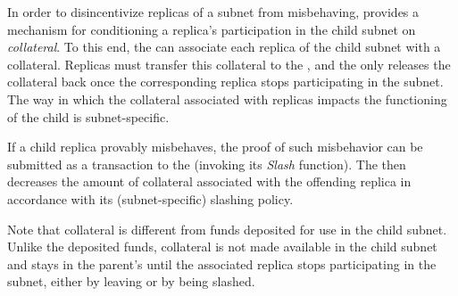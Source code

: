 In order to disincentivize replicas of a subnet from misbehaving, \ipc provides a mechanism for conditioning a replica's participation in the child subnet on \emph{collateral}.
To this end, the \sa can associate each replica of the child subnet with a collateral.
Replicas must transfer this collateral to the \sa, and the \sa only releases the collateral back once the corresponding replica stops participating in the subnet. The way in which the collateral associated with replicas impacts the functioning of the child is subnet-specific.



If a child replica provably misbehaves, the proof of such misbehavior can be submitted as a transaction to the \sa (invoking its \emph{Slash} function).
The \sa then decreases the amount of collateral associated with the offending replica in accordance with its (subnet-specific) slashing policy.

Note that collateral is different from funds deposited for use in the child subnet.
Unlike the deposited funds, collateral is not made available in the child subnet
and stays in the parent's \sa until the associated replica stops participating in the subnet, either by leaving or by being slashed.



